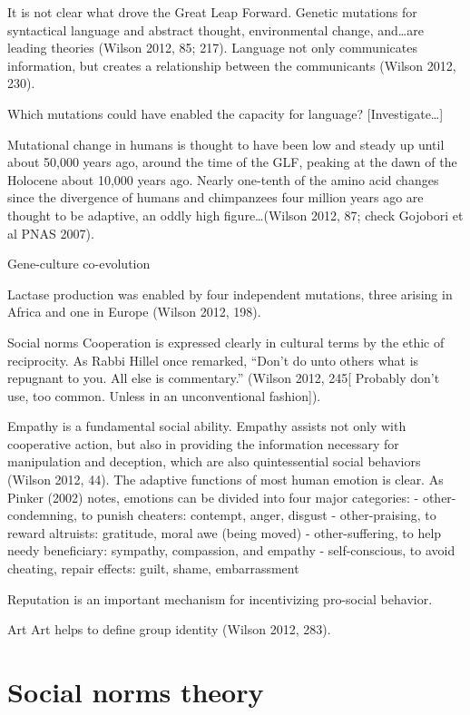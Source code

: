 \documentclass{tufte-book} %
\begin{document}
It is not clear what drove the Great Leap Forward. Genetic mutations for syntactical language and abstract thought, environmental change, and…are leading theories (Wilson 2012, 85; 217). Language not only communicates information, but creates a relationship between the communicants (Wilson 2012, 230).

Which mutations could have enabled the capacity for language? [Investigate…]

Mutational change in humans is thought to have been low and steady up until about 50,000 years ago, around the time of the GLF, peaking at the dawn of the Holocene about 10,000 years ago. Nearly one-tenth of the amino acid changes since the divergence of humans and chimpanzees four million years ago are thought to be adaptive, an oddly high figure…(Wilson 2012, 87; check Gojobori et al PNAS 2007).



Gene-culture co-evolution

Lactase production was enabled by four independent mutations, three arising in Africa and one in Europe (Wilson 2012, 198).


Social norms
Cooperation is expressed clearly in cultural terms by the ethic of reciprocity. As Rabbi Hillel once remarked, “Don’t do unto others what is repugnant to you. All else is commentary.” (Wilson 2012, 245[ Probably don’t use, too common. Unless in an unconventional fashion]).

Empathy is a fundamental social ability. Empathy assists not only with cooperative action, but also in providing the information necessary for manipulation and deception, which are also quintessential social behaviors (Wilson 2012, 44). The adaptive functions of most human emotion is clear. As Pinker (2002) notes, emotions can be divided into four major categories:
- other-condemning, to punish cheaters: contempt, anger, disgust 
- other-praising, to reward altruists: gratitude, moral awe (being moved) 
- other-suffering, to help needy beneficiary: sympathy, compassion, and empathy 
- self-conscious, to avoid cheating, repair effects: guilt, shame, embarrassment 

Reputation is an important mechanism for incentivizing pro-social behavior. 

Art
Art helps to define group identity (Wilson 2012, 283).



\section{Social norms theory}
\end{document}
